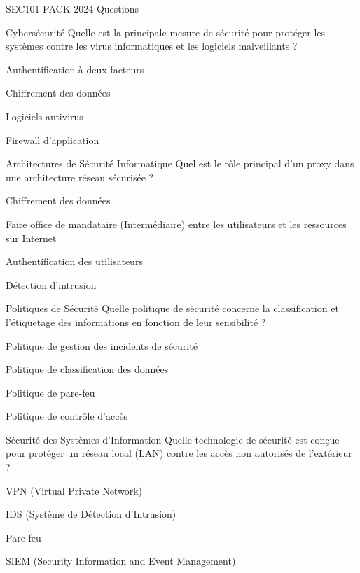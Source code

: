 \documentclass[12pt]{article}
\begin{document}
\begin{quiz}{SEC101 PACK 2024 Questions}
  \begin{multi}[points=1]{Cybersécurité}
    Quelle est la principale mesure de sécurité pour protéger les systèmes contre les virus informatiques et les logiciels malveillants ?
    \item Authentification à deux facteurs
    \item Chiffrement des données
    \item* Logiciels antivirus
    \item Firewall d'application
  \end{multi}

  \begin{multi}[points=1]{Architectures de Sécurité Informatique}
    Quel est le rôle principal d'un proxy dans une architecture réseau sécurisée ?
    \item Chiffrement des données
    \item* Faire office de mandataire (Intermédiaire) entre les utilisateurs et les ressources sur Internet
    \item Authentification des utilisateurs
    \item Détection d'intrusion
  \end{multi}

  \begin{multi}[points=1]{Politiques de Sécurité}
    Quelle politique de sécurité concerne la classification et l'étiquetage des informations en fonction de leur sensibilité ?
    \item Politique de gestion des incidents de sécurité
    \item* Politique de classification des données
    \item Politique de pare-feu
    \item Politique de contrôle d'accès
  \end{multi}

  \begin{multi}[points=1]{Sécurité des Systèmes d'Information}
    Quelle technologie de sécurité est conçue pour protéger un réseau local (LAN) contre les accès non autorisés de l'extérieur ?
    \item VPN (Virtual Private Network)
    \item IDS (Système de Détection d'Intrusion)
    \item* Pare-feu
    \item SIEM (Security Information and Event Management)
  \end{multi}


\end{quiz}
\end{document}
